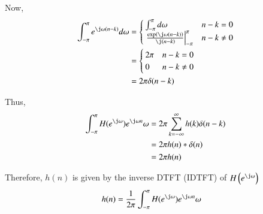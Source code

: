 \documentclass[journal,12pt,twocolumn]{IEEEtran}
\renewcommand\thesection{\arabic{section}}
\providecommand{\brak}[1]{\ensuremath{\left(#1\right)}}
\numberwithin{equation}{section}
\renewcommand\thesection{\arabic{section}}
\begin{document}
\begin{enumerate}[label=\thesection.\arabic*]
 Now,
 \begin{align}
   \int_{-\pi}^{\pi} e^{\j\omega(n-k)} {d\omega} 
   &= \begin{cases}
    \int_{-\pi}^\pi {d\omega} & n-k = 0 \\
    \left.\frac{\exp\brak{\j\omega(n-k)}}{\j(n-k)}\right|_{-\pi}^\pi & n-k \ne 0
   \end{cases} \\   
   &= \begin{cases}
    2\pi & n-k = 0 \\
    0 & n-k \ne 0
   \end{cases} \\
   &= 2\pi \delta(n-k)
 \end{align}
 
 Thus,
 \begin{align}
  \int_{-\pi}^{\pi} H(e^{\j\omega}) e^{\j\omega n} {\omega} &= 2\pi\sum_{k=-\infty}^\infty h(k) \delta(n-k) \\
  &= 2\pi h(n) * \delta(n) \\
  &= 2\pi h(n)
 \end{align}
 
 Therefore, $h(n)$ is given by the inverse DTFT (IDTFT) of $H\brak{e^{\j\omega}}$
 \begin{align}
  h(n) &= \frac{1}{2\pi} \int_{-\pi}^{\pi} H(e^{\j\omega}) e^{\j\omega n}  {\omega} 
 \end{align}
\end{enumerate}
%
\end{document}
